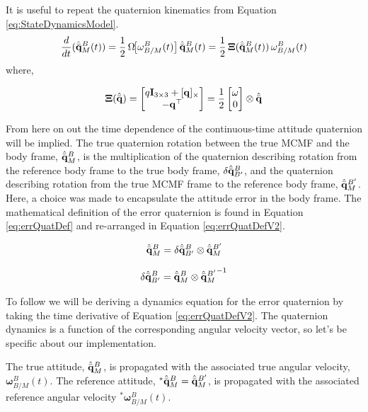 \documentclass[conf]{new-aiaa}
\newcommand{\vect}[1]{\mathbf{#1}}
\newcommand{\qBM}{\hat{\Bar{\mathbf{q}}}^B_{M}}    %
\newcommand{\qUnitGeneric}{\hat{\Bar{\mathbf{q}}}}
\newcommand{\qRef}{^*\hat{\Bar{\mathbf{q}}}^B_{M}}
\newcommand{\wBMRef}{^*\vect{\omega}^B_{B/M}}
\newcommand{\errQuat}{\delta\qUnitGeneric^{B}_{B'}}
\newcommand{\wBM}{\vect{\omega}^B_{B/M}}
\begin{document}
It is useful to repeat the quaternion kinematics from Equation \ref{eq:StateDynamicsModel}.
\begin{equation}
\frac{d}{dt}(\qBM(t)) = 
\frac{1}{2}\,\Omega\!\big[\wBM(t)\big]\,\qBM(t)
=
\frac{1}{2} \, \boldsymbol{\Xi}(\qBM(t)) \, \wBM(t)
\label{eq:quat_kinematics}
\end{equation}
where,

\begin{equation}
\boldsymbol{\Xi}(\qUnitGeneric) =
\begin{bmatrix}
q \mathbf{I}_{3 \times 3} + [\vect{q}]_\times \\
- \vect{q}^\top 
\end{bmatrix}
=
\frac{1}{2}
\begin{bmatrix}
\vect{\omega} \\ 0
\end{bmatrix}
\otimes
\qUnitGeneric
\label{eq:xi_matrix}
\end{equation}



From here on out the time dependence of the continuous-time attitude quaternion will be implied. The true quaternion rotation between the true MCMF and the body frame, $\qBM$, is the multiplication of the quaternion describing rotation from the reference body frame to the true body frame, $\errQuat$,  and the quaternion describing rotation from the true MCMF frame to the reference body frame, $\qUnitGeneric^{B'}_M$. Here, a choice was made to encapsulate the attitude error in the body frame. The mathematical definition of the error quaternion is found in Equation 
\ref{eq:errQuatDef} and re-arranged in Equation \ref{eq:errQuatDefV2}.

\begin{equation}
\qBM = \errQuat \otimes \qUnitGeneric^{B'}_M \\
\label{eq:errQuatDef}
\end{equation}


\begin{equation}
 \errQuat = \qBM \otimes {\qUnitGeneric^{B'}_M}^{-1}
\label{eq:errQuatDefV2}
\end{equation}


To follow we will be deriving a dynamics equation for the error quaternion by taking the time derivative of Equation \ref{eq:errQuatDefV2}. The quaternion dynamics is a function of the corresponding angular velocity vector, so let's be specific about our implementation.

The true attitude, $\qBM$, is propagated with the associated true angular velocity, $\wBM(t)$. The reference attitude, $\qRef = \qUnitGeneric^{B'}_M$, is propagated with the associated reference angular velocity $\wBMRef(t)$.  
\end{document}
